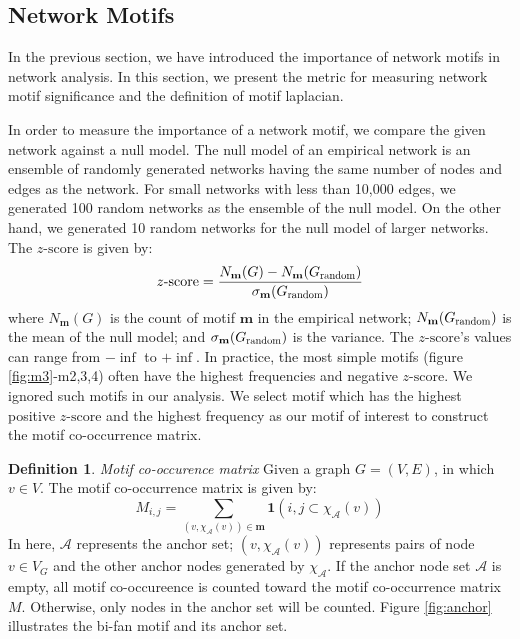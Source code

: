 \documentclass{article}
\theoremstyle{definition}
\newtheorem{definition}{Definition}[section]
\begin{document}
\subsection{Network Motifs}

In the previous section, we have introduced the importance of
network motifs in network analysis. In this section, we present
the metric for measuring network motif significance and the definition
of motif laplacian.

In order to measure the importance of a network motif, we compare
the given network against a null model. The null model of an empirical 
network 
is an ensemble of randomly generated networks having the same number of nodes and
edges as the network. For small networks with less than 10,000 edges, we
generated 100 random networks as the ensemble of the null model. On the other
hand, we generated 10 random networks for the null model of larger networks.
The $z\mbox{-score}$ is given by:
\begin{equation*}
z\mbox{-score} = \frac{N_\mathbf{m}(G)-N_\mathbf{m}(G_{\scalebox{0.75}{random}})}{\sigma_\mathbf{m}(G_{\scalebox{0.75}{random}})}
\end{equation*}
where $N_\mathbf{m}(G)$ is the count of motif $\mathbf{m}$ in the empirical
network; $N_\mathbf{m}(G_{\scalebox{0.75}{random}})$ is the mean of the
null model; and $\sigma_\mathbf{m}(G_{\scalebox{0.75}{random}})$ is the variance.
The $z\mbox{-score}$'s values can range from $-\inf$ to $+\inf$. In practice,
the most simple motifs (figure \ref{fig:m3}-m2,3,4) often have the highest
frequencies and negative $z\mbox{-score}$. We ignored such motifs in our analysis.
We select motif which has the highest positive $z\mbox{-score}$ and the highest frequency
as our motif of interest to construct the motif co-occurrence matrix.

\begin{definition} \emph{Motif co-occurence matrix}
Given a graph $G = (V,E)$, in which $v \in V$. The motif co-occurrence matrix
is given by:
$$M_{i,j} = \sum_{(v, \chi_{\mathcal{A}}(v)) \in \mathbf{m}} \mathbf{1}({i,j} \subset \chi_\mathcal{A}(v))$$
In here, $\mathcal{A}$ represents the anchor set; $(v, \chi_{\mathcal{A}}(v))$ 
represents pairs of node $v \in V_G$ and the other anchor nodes generated by $\chi_\mathcal{A}$.
If the anchor node set $\mathcal{A}$ is empty, all motif co-occureence is
counted toward the motif co-occurrence matrix $M$. Otherwise, only nodes in
the anchor set will be counted. Figure \ref{fig:anchor} illustrates
the bi-fan motif and its anchor set.
\end{definition}
\end{document}
